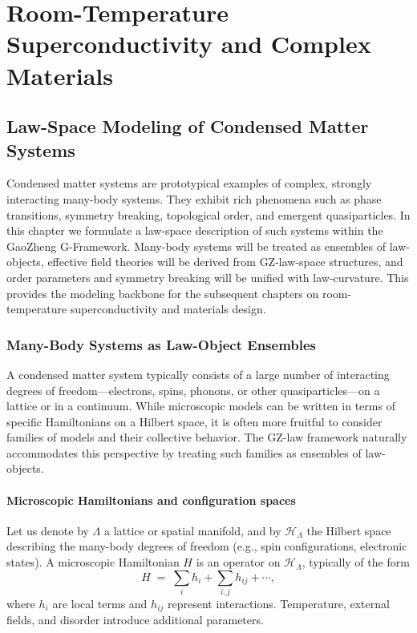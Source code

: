 \documentclass[11pt]{book}
\theoremstyle{plain}
\theoremstyle{definition}
\theoremstyle{remark}
\begin{document}
\part[Room-Temperature Superconductivity and Complex Materials]{Room-Temperature Superconductivity and Complex Materials}

\chapter[Law-Space Modeling of Condensed Matter Systems]{Law-Space Modeling of Condensed Matter Systems}
\label{chap:lawspace-condensed-matter}


Condensed matter systems are prototypical examples of complex,
strongly interacting many-body systems. They exhibit rich phenomena
such as phase transitions, symmetry breaking, topological order, and
emergent quasiparticles. In this chapter we formulate a law-space
description of such systems within the GaoZheng G-Framework. Many-body
systems will be treated as ensembles of law-objects, effective field
theories will be derived from GZ-law-space structures, and order
parameters and symmetry breaking will be unified with law-curvature.
This provides the modeling backbone for the subsequent chapters on
room-temperature superconductivity and materials design.

\section{Many-Body Systems as Law-Object Ensembles}
\label{sec:manybody-law-ensembles}


A condensed matter system typically consists of a large number of
interacting degrees of freedom—electrons, spins, phonons, or other
quasiparticles—on a lattice or in a continuum. While microscopic
models can be written in terms of specific Hamiltonians on a
Hilbert space, it is often more fruitful to consider families of
models and their collective behavior. The GZ-law framework naturally
accommodates this perspective by treating such families as ensembles
of law-objects.

\subsection*{Microscopic Hamiltonians and configuration spaces}

Let us denote by $\Lambda$ a lattice or spatial manifold, and by
$\mathcal{H}_\Lambda$ the Hilbert space describing the many-body
degrees of freedom (e.g., spin configurations, electronic states).
A microscopic Hamiltonian $H$ is an operator on $\mathcal{H}_\Lambda$,
typically of the form
\[
   H \;=\; \sum_{i} h_i + \sum_{i,j} h_{ij} + \cdots,
\]
where $h_i$ are local terms and $h_{ij}$ represent interactions.
Temperature, external fields, and disorder introduce additional
parameters.
\end{document}
